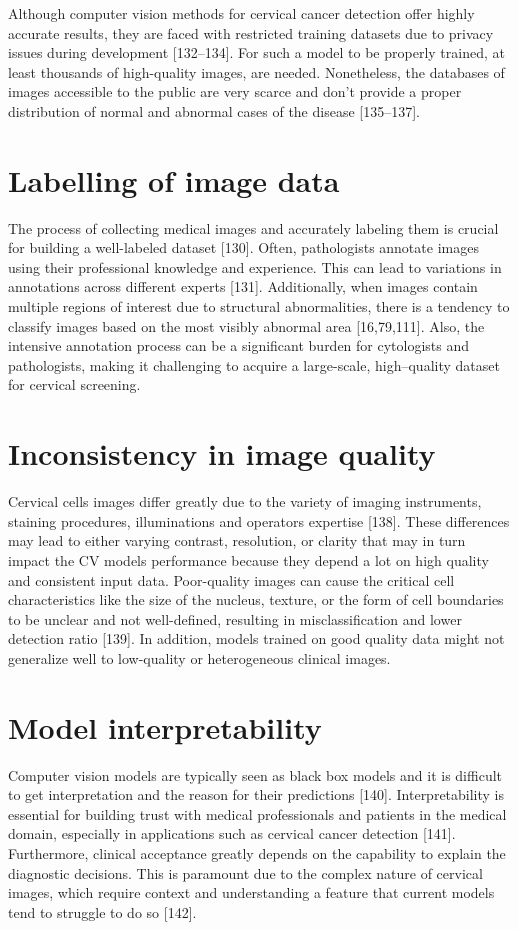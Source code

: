 \documentclass{svjour3}
\begin{document}
Although computer vision methods for cervical cancer detection offer highly accurate results, they are faced with restricted training datasets due to privacy issues during development [132–134]. For such a model to be properly trained, at least thousands of high-quality images, are needed. Nonetheless, the databases of images accessible to the public are very scarce and don’t provide a proper distribution of normal and abnormal cases of the disease [135–137].
\section{Labelling of image data}
The process of collecting medical images and accurately labeling them is crucial for building a well-labeled dataset [130]. Often, pathologists annotate images using their professional knowledge and experience. This can lead to variations in annotations across different experts [131]. Additionally, when images contain multiple regions of interest due to structural abnormalities, there is a tendency to classify images based on the most visibly abnormal area [16,79,111]. Also, the intensive annotation process can be a significant burden for cytologists and pathologists, making it challenging to acquire a large-scale, high--quality dataset for cervical screening.
\section{Inconsistency in image quality}
Cervical cells images differ greatly due to the variety of imaging instruments, staining procedures, illuminations and operators expertise [138]. These differences may lead to either varying contrast, resolution, or clarity that may in turn impact the CV models performance because they depend a lot on high quality and consistent input data. Poor-quality images can cause the critical cell characteristics like the size of the nucleus, texture, or the form of cell boundaries to be unclear and not well-defined, resulting in misclassification and lower detection ratio [139]. In addition, models trained on good quality data might not generalize well to low-quality or heterogeneous clinical images.
\section{Model interpretability}
Computer vision models are typically seen as black box models and it is difficult to get interpretation and the reason for their predictions [140]. Interpretability is essential for building trust with medical professionals and patients in the medical domain, especially in applications such as cervical cancer detection [141]. Furthermore, clinical acceptance greatly depends on the capability to explain the diagnostic decisions. This is paramount due to the complex nature of cervical images, which require context and understanding a feature that current models tend to struggle to do so [142].
\end{document}
